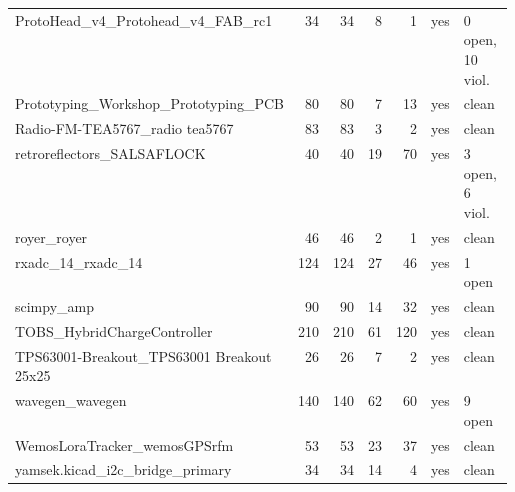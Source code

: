 \begin{longtable}{@{}p{0.36\linewidth}rrrrcp{0.22\linewidth}@{}}
ProtoHead\_\allowbreak{}v4\_\allowbreak{}Protohead\_\allowbreak{}v4\_\allowbreak{}FAB\_\allowbreak{}rc1 & 34 & 34 & 8 & 1 & \textcolor{fraqua}{yes} & {\footnotesize 0 open, 10 viol.} \\
Prototyping\_\allowbreak{}Workshop\_\allowbreak{}Prototyping\_\allowbreak{}PCB & 80 & 80 & 7 & 13 & \textcolor{fraqua}{yes} & {\footnotesize clean} \\
Radio-\allowbreak{}FM-\allowbreak{}TEA5767\_\allowbreak{}radio tea5767 & 83 & 83 & 3 & 2 & \textcolor{fraqua}{yes} & {\footnotesize clean} \\
retroreflectors\_\allowbreak{}SALSAFLOCK & 40 & 40 & 19 & 70 & \textcolor{fraqua}{yes} & {\footnotesize 3 open, 6 viol.} \\
royer\_\allowbreak{}royer & 46 & 46 & 2 & 1 & \textcolor{fraqua}{yes} & {\footnotesize clean} \\
rxadc\_\allowbreak{}14\_\allowbreak{}rxadc\_\allowbreak{}14 & 124 & 124 & 27 & 46 & \textcolor{fraqua}{yes} & {\footnotesize 1 open} \\
scimpy\_\allowbreak{}amp & 90 & 90 & 14 & 32 & \textcolor{fraqua}{yes} & {\footnotesize clean} \\
TOBS\_\allowbreak{}HybridChargeController & 210 & 210 & 61 & 120 & \textcolor{fraqua}{yes} & {\footnotesize clean} \\
TPS63001-\allowbreak{}Breakout\_\allowbreak{}TPS63001 Breakout 25x25 & 26 & 26 & 7 & 2 & \textcolor{fraqua}{yes} & {\footnotesize clean} \\
wavegen\_\allowbreak{}wavegen & 140 & 140 & 62 & 60 & \textcolor{fraqua}{yes} & {\footnotesize 9 open} \\
WemosLoraTracker\_\allowbreak{}wemosGPSrfm & 53 & 53 & 23 & 37 & \textcolor{fraqua}{yes} & {\footnotesize clean} \\
yamsek.kicad\_\allowbreak{}i2c\_\allowbreak{}bridge\_\allowbreak{}primary & 34 & 34 & 14 & 4 & \textcolor{fraqua}{yes} & {\footnotesize clean} \\
\bottomrule\end{longtable}
